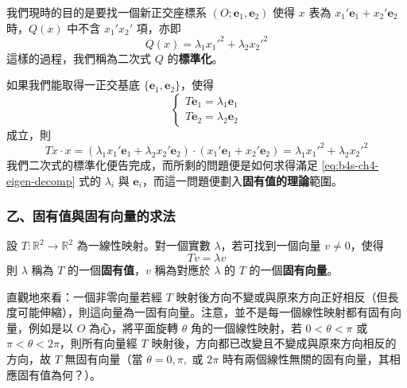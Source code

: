 我們現時的目的是要找一個新正交座標系 $(O; \mathbf{e}_1, \mathbf{e}_2)$ 使得 $x$ 表為 $x_1' \mathbf{e}_1 + x_2' \mathbf{e}_2$ 時，$Q(x)$ 中不含 $x_1' x_2'$ 項，亦即
\begin{equation}
Q(x) = \lambda_1 {x_1'}^2 + \lambda_2 {x_2'}^2
\label{eq:b4s-ch4-diagonalized-form}
\end{equation}
這樣的過程，我們稱為二次式 $Q$ 的\textbf{標準化}。

如果我們能取得一正交基底 $\{\mathbf{e}_1, \mathbf{e}_2\}$，使得
\begin{equation}
\begin{cases}
T\mathbf{e}_1 = \lambda_1 \mathbf{e}_1 \\
T\mathbf{e}_2 = \lambda_2 \mathbf{e}_2
\end{cases}
\label{eq:b4s-ch4-eigen-decomp}
\end{equation}
成立，則
\begin{equation}
Tx \cdot x = (\lambda_1 x_1' \mathbf{e}_1 + \lambda_2 x_2' \mathbf{e}_2) \cdot (x_1' \mathbf{e}_1 + x_2' \mathbf{e}_2) = \lambda_1 {x_1'}^2 + \lambda_2 {x_2'}^2
\label{eq:b4s-ch4-diagonalized-inner-prod}
\end{equation}
我們二次式的標準化便告完成，而所剩的問題便是如何求得滿足 \eqref{eq:b4s-ch4-eigen-decomp} 式的 $\lambda_i$ 與 $\mathbf{e}_i$，而這一問題便劃入\textbf{固有值的理論}範圍。

\subsubsection*{乙、\quad 固有值與固有向量的求法}

\begin{definition}
設 $T: \mathbb{R}^2 \to \mathbb{R}^2$ 為一線性映射。對一個實數 $\lambda$，若可找到一個向量 $v \ne 0$，使得
\begin{equation}
Tv = \lambda v
\label{eq:b4s-ch4-eigen-def}
\end{equation}
則 $\lambda$ 稱為 $T$ 的一個\textbf{固有值}，$v$ 稱為對應於 $\lambda$ 的 $T$ 的一個\textbf{固有向量}。
\end{definition}

直觀地來看：一個非零向量若經 $T$ 映射後方向不變或與原來方向正好相反（但長度可能伸縮），則這向量為一固有向量。注意，並不是每一個線性映射都有固有向量，例如是以 $O$ 為心，將平面旋轉 $\theta$ 角的一個線性映射，若 $0 < \theta < \pi$ 或 $\pi < \theta < 2\pi$，則所有向量經 $T$ 映射後，方向都已改變且不變成與原來方向相反的方向，故 $T$ 無固有向量（當 $\theta = 0, \pi,$ 或 $2\pi$ 時有兩個線性無關的固有向量，其相應固有值為何？）。


